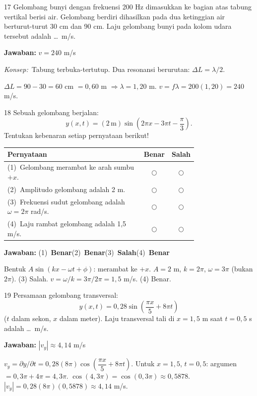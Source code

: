 \documentclass[11pt]{article}
\newcommand{\jawaban}[1]{%
  \noindent\colorbox{gold!30}{\parbox{\dimexpr\linewidth-2\fboxsep\relax}{%
    \textbf{Jawaban:} #1}}\par\smallskip}
\newcommand{\konsep}{\noindent\textit{Konsep:}\ \ignorespaces}
\begin{document}
\begin{soal}{17}  %
Gelombang bunyi dengan frekuensi 200 Hz dimasukkan ke bagian atas
tabung vertikal berisi air. Gelombang berdiri dihasilkan pada dua
ketinggian air berturut-turut 30 cm dan 90 cm. Laju gelombang bunyi
pada kolom udara tersebut adalah \ldots\ m/s.
\end{soal}
\begin{pembox}
\jawaban{$v = 240$ m/s}
\konsep Tabung terbuka-tertutup. Dua resonansi berurutan: $\Delta L = \lambda/2$.

$\Delta L = 90 - 30 = 60$ cm $= 0{,}60$ m $\Rightarrow \lambda = 1{,}20$ m.
$v = f\lambda = 200(1{,}20) = 240$ m/s.
\end{pembox}

\begin{soal}{18}  %
Sebuah gelombang berjalan:
\[
  y(x,t) = (2\,\text{m})\sin\!\left(2\pi x - 3\pi t - \frac{\pi}{3}\right).
\]
Tentukan kebenaran setiap pernyataan berikut!

\par\smallskip
{\renewcommand{\arraystretch}{1.4}%
\begin{tabular}{@{}p{0.76\linewidth}cc@{}}
\hline
\textbf{Pernyataan} & \textbf{Benar} & \textbf{Salah}\\
\hline
(1)~Gelombang merambat ke arah sumbu $+x$.
  & $\bigcirc$ & $\bigcirc$\\
(2)~Amplitudo gelombang adalah 2 m.
  & $\bigcirc$ & $\bigcirc$\\
(3)~Frekuensi sudut gelombang adalah $\omega = 2\pi$ rad/s.
  & $\bigcirc$ & $\bigcirc$\\
(4)~Laju rambat gelombang adalah 1,5 m/s.
  & $\bigcirc$ & $\bigcirc$\\
\hline
\end{tabular}}
\end{soal}
\begin{pembox}
\jawaban{(1)~\textbf{Benar}\quad(2)~\textbf{Benar}\quad(3)~\textbf{Salah}\quad(4)~\textbf{Benar}}
Bentuk $A\sin(kx-\omega t+\phi)$: merambat ke $+x$. $A=2$ m, $k=2\pi$, $\omega=3\pi$ (bukan $2\pi$). (3) Salah.
$v = \omega/k = 3\pi/2\pi = 1{,}5$ m/s. (4) Benar.
\end{pembox}

\begin{soal}{19}  %
Persamaan gelombang transversal:
\[
  y(x,t) = 0{,}28\sin\!\left(\frac{\pi x}{5} + 8\pi t\right)
\]
($t$ dalam sekon, $x$ dalam meter). Laju transversal tali di
$x=1{,}5$ m saat $t=0{,}5$ s adalah \ldots\ m/s.
\end{soal}
\begin{pembox}
\jawaban{$|v_y| \approx 4{,}14$ m/s}
$v_y = \partial y/\partial t = 0{,}28(8\pi)\cos\!\left(\dfrac{\pi x}{5}+8\pi t\right)$.
Untuk $x=1{,}5$, $t=0{,}5$: argumen $= 0{,}3\pi + 4\pi = 4{,}3\pi$.
$\cos(4{,}3\pi)=\cos(0{,}3\pi)\approx0{,}5878$.
$|v_y| = 0{,}28(8\pi)(0{,}5878)\approx4{,}14$ m/s.
\end{pembox}
\end{document}
